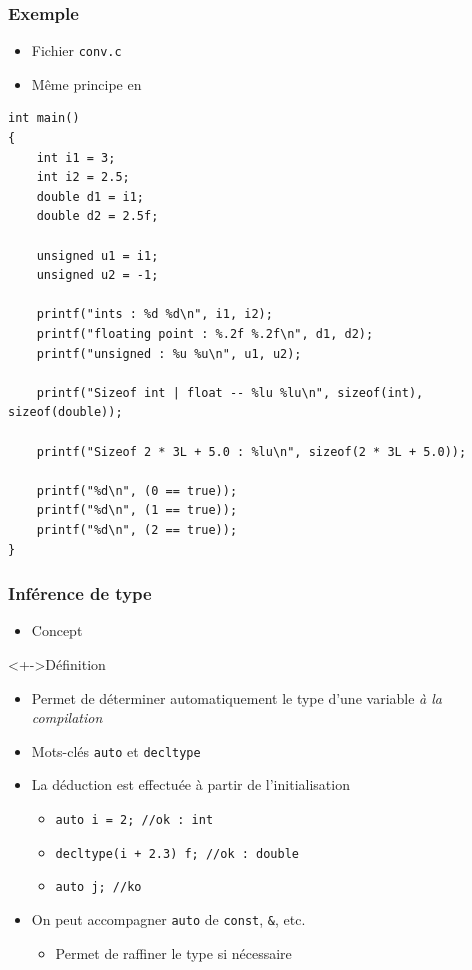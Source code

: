 \begin{frame}[containsverbatim]
\frametitle{Exemple}
\begin{itemize}
\item Fichier \texttt{conv.c}
\item Même principe en \cpp
\end{itemize}
\begin{lstlisting}
int main()
{
	int i1 = 3;
	int i2 = 2.5;
	double d1 = i1;
	double d2 = 2.5f;

	unsigned u1 = i1;
	unsigned u2 = -1;

	printf("ints : %d %d\n", i1, i2);
	printf("floating point : %.2f %.2f\n", d1, d2);
	printf("unsigned : %u %u\n", u1, u2);

	printf("Sizeof int | float -- %lu %lu\n", sizeof(int), sizeof(double));

	printf("Sizeof 2 * 3L + 5.0 : %lu\n", sizeof(2 * 3L + 5.0));

	printf("%d\n", (0 == true));
	printf("%d\n", (1 == true));
	printf("%d\n", (2 == true));
}
\end{lstlisting}
\end{frame}

\begin{frame}
\frametitle{Inférence de type}
\begin{itemize}[<+->]
\item Concept \cpp
\end{itemize}
\begin{exampleblock}<+->{Définition}
	\begin{itemize}[<+->]
	\item Permet de déterminer automatiquement le type d'une variable \emph{à la compilation}
	\item Mots-clés \lstinline|auto| et \lstinline|decltype|
	\end{itemize}
\end{exampleblock}
\begin{itemize}[<+->]
\item La déduction est effectuée à partir de l'initialisation
	\begin{itemize}
	\item \lstinline|auto i = 2; //ok : int|
	\item \lstinline|decltype(i + 2.3) f; //ok : double|
	\item \lstinline|auto j; //ko|
	\end{itemize}
\item On peut accompagner \lstinline|auto| de \lstinline|const|, \texttt{\&}, etc.
	\begin{itemize}
	\item Permet de raffiner le type si nécessaire
	\end{itemize}
\end{itemize}
\end{frame}

